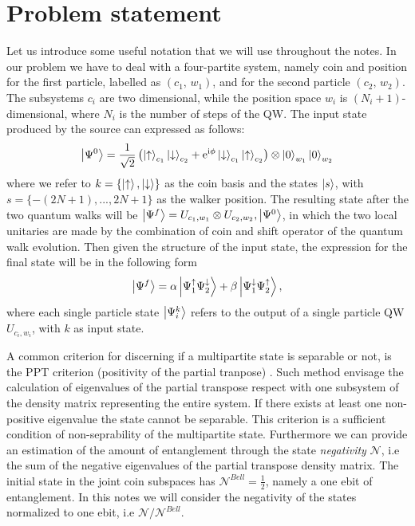 \documentclass[
	aps, pra, authorblock, superscriptaddress, twocolumn,
	10pt
]{revtex4-1}
\begin{document}
\section{Problem statement}
Let us introduce some useful notation that we will use throughout the notes. In our problem we have to deal with a four-partite system, namely coin and position for the first particle, labelled as $(c_1, \, w_1)$, and for the second particle $(c_2, \, w_2)$. The subsystems $c_i$ are two dimensional, while the position space $w_i$ is $(N_{i}+1)$-dimensional, where $N_{i}$ is the number of steps of the QW.
The input state produced by the source can expressed as follows:
\begin{equation}
    \ket{\Psi^0} = \frac{1}{\sqrt{2}}
    \left ( \ket{\uparrow}_{c_1}\ket{\downarrow}_{c_2}+ \mathrm{e}^{\mathrm{i}\phi}\ket{\downarrow}_{c_1}\ket{\uparrow}_{c_2}\right ) \otimes \ket{0}_{w_1}\ket{0}_{w_2} 
    \label{eq:initial_state}
\end{equation}
where we refer to $k=\{\ket{\uparrow}, \ket{\downarrow}\}$ as the coin basis and the states $\ket{s}$, with $s=\{-(2N+1),..., 2N+1\}$ as the walker position. The resulting state after the two quantum walks will be $\ket{\Psi^f}=U_{c_1,w_1} \otimes U_{c_2,w_2},  \ket{\Psi^0}$, in which the two local unitaries are made by the combination of coin and shift operator of the quantum walk evolution. Then given the structure of the input state, the expression for the final state will be in the following form
\begin{equation}
\ket{\Psi^f} = \alpha \ket{\Psi^{\uparrow}_1\Psi^{\downarrow}_2 }+\beta \ket{\Psi^{\downarrow}_1\Psi^{\uparrow}_2},
\label{eq:final_state}
\end{equation}
where each single particle state $\ket{\Psi^k_i}$ refers to the output of a single particle QW $U_{c_i,w_i}$, with $k$ as input state.

A common criterion for discerning if a multipartite state is separable or not, is the PPT criterion (positivity of the partial tranpose) \cite{HORODECKI19961}. Such method envisage the calculation of eigenvalues of the partial transpose respect with one subsystem of the density matrix representing the entire system. If there exists at least one non-positive eigenvalue the state cannot be separable. This criterion is a sufficient condition of non-seprability of the multipartite state. Furthermore we can provide an estimation of the amount of entanglement through the state \emph{negativity} $\mathcal{N}$, i.e the sum of the negative eigenvalues of the partial transpose density matrix. The initial state in the joint coin subspaces has $\mathcal{N}^{Bell}=\frac{1}{2}$, namely a one ebit of entanglement. In this notes we will consider the negativity of the states normalized to one ebit, i.e $\mathcal{N}/\mathcal{N}^{Bell}.$
\end{document}
